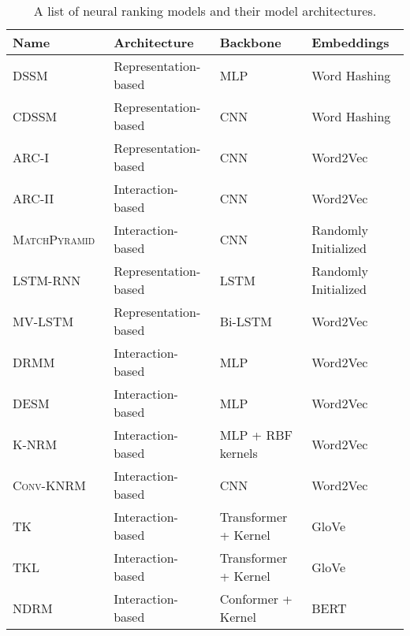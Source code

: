 \begin{table*}[t!]
\centering
{} %
\resizebox{0.99\textwidth}{!}
{
\begin{tabular}{llll}
\toprule
\textbf{Name} & \textbf{Architecture} & \textbf{Backbone}  & \textbf{Embeddings} \\
\midrule
\textsc{DSSM}~\cite{huang2013dssm} & Representation-based & MLP & Word Hashing \\
\textsc{CDSSM}~\cite{shen2014cdssm} & Representation-based & CNN &  Word Hashing \\
\textsc{ARC-I}~\cite{hu2014convolutional} & Representation-based & CNN &  Word2Vec \\
\textsc{ARC-II}~\cite{hu2014convolutional} & Interaction-based & CNN &  Word2Vec \\
\textsc{MatchPyramid}~\cite{pang2016matchpyramid} & Interaction-based & CNN &  Randomly Initialized \\
\textsc{LSTM-RNN}~\cite{palangi2016deep} & Representation-based & LSTM &  Randomly Initialized \\
\textsc{MV-LSTM}~\cite{wan2016deep} & Representation-based & Bi-LSTM &  Word2Vec \\
\textsc{DRMM}~\cite{guo2016deep} & Interaction-based & MLP & Word2Vec \\
\textsc{DESM}~\cite{Nalisnick2016ImprovingDR} & Interaction-based & MLP &  Word2Vec \\
\textsc{K-NRM}~\cite{xiong2017knrm} & Interaction-based & MLP + RBF kernels &  Word2Vec \\
\textsc{Conv-KNRM}~\cite{dai2018cknrm} & Interaction-based & CNN & Word2Vec \\
\textsc{TK}~\cite{hofstatter2020interpretable} & Interaction-based & Transformer + Kernel &  GloVe \\
\textsc{TKL}~\cite{hofstatter2020improving} & Interaction-based & Transformer + Kernel &  GloVe \\
\textsc{NDRM}~\citep{mitra2021improving} & Interaction-based & Conformer + Kernel & \textsc{BERT} \\

\bottomrule
\end{tabular}
}
\caption{A list of neural ranking models and their model architectures.}
\label{tab:neural_ranking_appendix}
\end{table*}